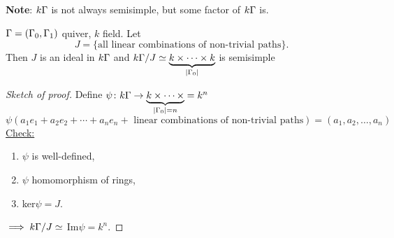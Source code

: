 \textbf{Note}: $k\Gamma$ is not always semisimple, but some factor of $k\Gamma$ is.

\begin{prop}\label{prop:3}
  $\Gamma=(\Gamma_0,\Gamma_1) $ quiver, $k$ field. Let
\[J = \{\text{all linear combinations of non-trivial paths}\}.\] 
Then $J$ is an ideal in $k\Gamma$ and
  $k\Gamma/J \simeq \underbrace{k \times \cdots \times k}_{|\Gamma_0|}$
  is semisimple
\end{prop}
\begin{proof}[Sketch of proof]
  Define $\psi\colon k\Gamma \rightarrow \underbrace{k \times \cdots \times}_{|\Gamma_0|=n} = k^n $
\[\psi(a_1e_1 + a_2e_2 + \cdots + a_ne_n + \text{ linear combinations
    of non-trivial paths} ) = (a_1, a_2,\ldots, a_n)\]
  \underline{Check:} \begin{enumerate}
		\item  $\psi$ is well-defined,
		\item $\psi$ homomorphism of rings,
		\item ker$\psi=J$. 
	\end{enumerate}
	$\implies k\Gamma/J \simeq$ Im$\psi=k^n$.
\end{proof}
